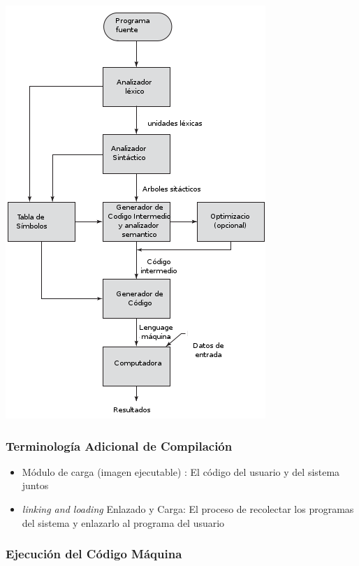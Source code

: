 \documentclass[11pt]{article}
\begin{document}
\includegraphics[width=.9\linewidth]{procesocomp.png} 

\subsubsection*{Terminología Adicional de Compilación}
\label{sec:orgheadline18}

\begin{itemize}
\item Módulo de carga (imagen ejecutable) : El código del usuario y del
sistema juntos
\item \emph{linking and loading} Enlazado y Carga: El proceso de recolectar los
programas del sistema y enlazarlo al programa del usuario
\end{itemize}

\subsubsection*{Ejecución del Código Máquina}
\label{sec:orgheadline19}
\end{document}
